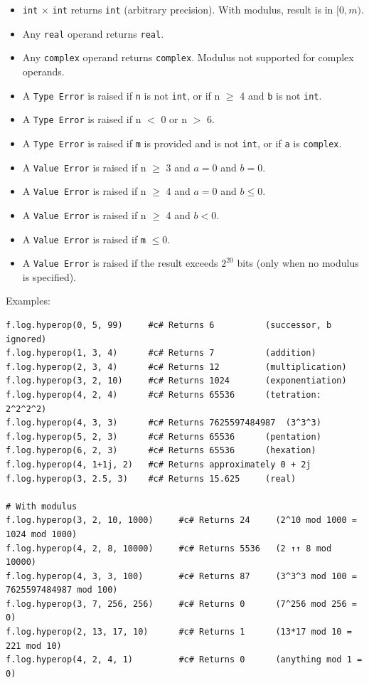 \begin{itemize}
\item \texttt{int} $\times$ \texttt{int} returns \texttt{int} (arbitrary precision). With modulus, result is in $[0, m)$.
\item Any \texttt{real} operand returns \texttt{real}.
\item Any \texttt{complex} operand returns \texttt{complex}. Modulus not supported for complex operands.
\item A \texttt{Type Error} is raised if \texttt{n} is not \texttt{int}, or if n $\geq$ 4 and \texttt{b} is not \texttt{int}.
\item A \texttt{Type Error} is raised if n $<$ 0 or n $>$ 6.
\item A \texttt{Type Error} is raised if \texttt{m} is provided and is not \texttt{int}, or if \texttt{a} is \texttt{complex}.
\item A \texttt{Value Error} is raised if n $\geq$ 3 and $a = 0$ and $b = 0$.
\item A \texttt{Value Error} is raised if n $\geq$ 4 and $a = 0$ and $b \leq 0$.
\item A \texttt{Value Error} is raised if n $\geq$ 4 and $b < 0$.
\item A \texttt{Value Error} is raised if \texttt{m} $\leq 0$.
\item A \texttt{Value Error} is raised if the result exceeds $2^{20}$ bits (only when no modulus is specified).
\end{itemize}

Examples:
\begin{verbatim}
f.log.hyperop(0, 5, 99)     #c# Returns 6          (successor, b ignored)
f.log.hyperop(1, 3, 4)      #c# Returns 7          (addition)
f.log.hyperop(2, 3, 4)      #c# Returns 12         (multiplication)
f.log.hyperop(3, 2, 10)     #c# Returns 1024       (exponentiation)
f.log.hyperop(4, 2, 4)      #c# Returns 65536      (tetration: 2^2^2^2)
f.log.hyperop(4, 3, 3)      #c# Returns 7625597484987  (3^3^3)
f.log.hyperop(5, 2, 3)      #c# Returns 65536      (pentation)
f.log.hyperop(6, 2, 3)      #c# Returns 65536      (hexation)
f.log.hyperop(4, 1+1j, 2)   #c# Returns approximately 0 + 2j
f.log.hyperop(3, 2.5, 3)    #c# Returns 15.625     (real)

# With modulus
f.log.hyperop(3, 2, 10, 1000)     #c# Returns 24     (2^10 mod 1000 = 1024 mod 1000)
f.log.hyperop(4, 2, 8, 10000)     #c# Returns 5536   (2 ↑↑ 8 mod 10000)
f.log.hyperop(4, 3, 3, 100)       #c# Returns 87     (3^3^3 mod 100 = 7625597484987 mod 100)
f.log.hyperop(3, 7, 256, 256)     #c# Returns 0      (7^256 mod 256 = 0)
f.log.hyperop(2, 13, 17, 10)      #c# Returns 1      (13*17 mod 10 = 221 mod 10)
f.log.hyperop(4, 2, 4, 1)         #c# Returns 0      (anything mod 1 = 0)
\end{verbatim}

